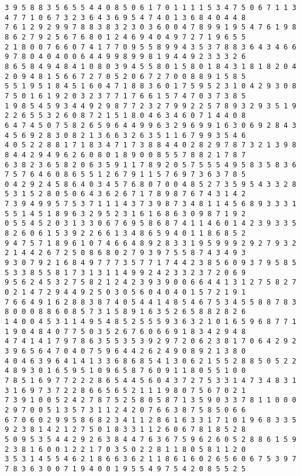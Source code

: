 \begin{verbatim}
3 9 5 8 8 3 5 6 5 5 4 4 0 8 5 0 6 1 7 0 1 1 1 1 5 3 4 7 5 0 6 7 1 1 3 4 7 7 1 0 6 7 3 2 3 6 4 3 6 9 5 4 7 4 0 1 3 6 8 4 0 4 4 8
7 6 1 2 9 2 9 9 7 8 8 3 8 3 2 3 0 3 6 0 0 4 7 8 9 9 1 9 5 4 7 6 1 9 8 8 6 2 7 9 2 5 6 7 6 8 0 1 2 4 6 9 4 0 4 9 7 2 7 1 9 6 5 5
2 1 8 0 0 7 6 6 0 7 4 1 7 7 0 9 5 5 8 9 9 4 3 5 3 7 8 8 3 6 4 3 4 6 6 9 7 8 0 4 0 4 0 0 6 4 4 9 9 8 9 9 8 1 9 4 4 9 2 3 3 3 2 6
8 6 5 8 4 9 4 8 4 1 0 8 0 3 9 4 5 5 8 0 1 5 8 0 1 8 4 3 1 8 1 8 2 0 4 2 0 9 4 8 1 5 6 6 7 2 7 0 5 2 0 6 7 2 7 0 0 8 8 9 1 5 8 5
5 5 1 9 5 1 8 4 5 1 6 0 4 7 1 8 8 3 6 0 1 7 5 9 5 2 3 1 0 4 2 9 3 0 8 7 5 0 1 6 1 9 2 0 3 2 3 7 7 1 7 6 6 1 5 7 4 7 0 3 7 3 8 5
1 9 8 5 4 5 9 3 4 4 9 2 9 8 7 7 2 3 2 7 9 9 2 2 5 7 8 9 3 2 9 3 5 1 9 2 2 6 5 5 3 2 6 0 8 7 2 1 5 1 8 0 4 6 3 4 6 0 7 1 4 4 0 8
6 4 7 4 5 0 7 5 8 2 6 5 9 6 4 4 9 9 6 3 2 9 6 9 9 1 6 3 0 6 9 2 8 4 3 4 5 6 9 2 8 3 0 8 2 1 3 6 6 3 2 6 3 5 1 1 6 7 9 9 3 5 4 6
4 0 5 2 2 8 8 1 7 1 8 3 4 7 1 7 3 8 8 4 4 0 2 8 2 9 7 8 7 3 2 1 3 9 8 8 4 4 2 9 4 9 6 2 6 0 8 0 1 8 9 0 0 8 5 5 7 8 8 2 1 7 8 7
6 3 8 2 3 6 5 8 2 0 6 3 5 9 1 1 7 8 9 2 0 5 7 5 5 5 4 9 5 8 3 5 8 3 6 7 5 7 6 4 6 0 8 6 5 5 1 2 6 7 9 1 1 5 7 6 9 7 3 6 3 7 8 5
0 4 2 9 2 4 5 8 6 4 0 3 4 5 7 6 8 0 7 0 0 4 8 5 2 7 3 5 9 5 4 3 3 2 8 5 3 1 5 2 8 0 5 0 6 4 3 6 2 6 7 1 7 8 9 8 7 6 7 4 3 1 4 2
7 3 9 4 9 9 5 7 5 3 7 1 1 1 4 3 7 3 9 8 7 3 4 8 1 1 4 5 6 8 9 3 3 3 1 5 5 1 4 5 1 8 9 6 3 2 9 5 2 3 1 6 1 6 8 6 3 0 9 8 7 1 9 2
0 5 5 4 5 2 0 3 1 3 3 0 6 7 6 9 5 8 6 8 7 4 1 1 4 6 0 1 4 2 3 9 3 3 5 8 2 6 0 6 1 5 3 9 2 2 6 6 1 3 4 8 6 5 9 4 0 1 1 8 6 8 5 2
9 4 7 5 7 1 8 9 6 1 0 7 4 6 6 4 8 9 2 8 3 3 1 9 5 9 9 9 2 9 2 7 9 3 2 2 1 4 4 2 6 7 2 5 0 8 6 8 0 2 7 9 3 9 7 5 5 8 7 4 3 4 9 3
9 3 0 7 9 2 1 6 8 4 9 7 7 7 3 5 7 7 1 7 4 4 2 3 8 5 6 0 9 3 7 9 5 8 5 5 3 3 8 5 5 8 1 7 3 1 3 1 1 4 9 9 2 4 2 3 3 2 3 7 2 0 6 9
9 5 6 2 4 5 3 2 7 5 8 2 1 2 4 2 3 9 3 9 0 0 6 6 4 4 1 3 1 2 7 5 8 2 7 0 2 1 4 7 2 9 4 4 9 2 5 0 3 0 5 6 0 4 0 4 0 1 5 7 2 1 9 1
7 6 6 4 9 1 6 2 8 8 3 8 7 4 0 5 4 4 1 4 8 5 4 6 7 5 3 4 5 5 8 8 7 8 3 8 0 0 0 8 8 6 0 8 5 7 3 1 5 8 9 1 6 3 5 2 6 5 8 8 2 8 2 6
1 4 0 0 4 5 3 1 1 4 9 5 4 8 5 2 5 5 5 9 3 6 3 2 1 0 1 6 5 9 6 8 7 7 1 1 9 0 4 8 4 0 7 7 5 0 3 5 2 6 7 6 0 6 6 9 1 8 3 4 2 9 4 8
4 7 4 1 4 1 7 9 7 8 6 3 5 5 3 5 3 9 2 9 7 2 0 6 2 3 8 1 7 0 6 4 2 9 2 3 9 6 5 6 4 7 0 4 0 7 5 9 6 4 4 2 6 2 4 9 0 8 9 2 1 3 8 0
4 0 4 6 3 9 6 4 1 4 1 3 3 6 8 6 8 5 4 1 3 0 6 2 1 5 5 2 8 8 5 0 5 2 2 4 8 9 3 0 1 6 5 9 5 1 0 9 6 5 8 7 6 0 9 1 1 8 0 5 5 1 0 0
7 8 5 1 6 9 7 7 2 2 2 8 6 5 4 4 5 6 0 4 3 7 2 7 5 3 3 1 4 7 3 4 8 3 1 3 1 6 9 7 3 7 2 2 8 6 6 5 6 5 2 1 1 1 9 8 0 7 5 6 7 0 2 1
7 3 9 1 0 0 5 2 4 2 7 8 7 5 2 5 8 0 5 8 7 1 3 5 9 0 3 3 7 8 1 1 0 0 0 2 9 7 0 0 5 1 3 5 7 3 1 1 2 4 2 0 7 6 6 3 8 7 5 8 5 0 6 6
6 7 0 6 0 2 9 9 5 8 6 8 2 3 4 1 1 2 8 6 1 6 3 3 1 7 1 0 1 9 6 8 3 3 5 9 2 3 8 1 4 2 1 2 7 5 0 1 8 3 3 1 1 2 6 0 6 7 8 1 8 5 2 8
5 0 9 5 3 5 4 4 2 9 2 6 3 8 4 4 7 6 3 6 7 5 9 6 2 6 0 5 2 8 8 6 1 5 9 2 3 8 1 6 0 0 1 2 2 1 7 0 3 5 0 2 2 8 1 1 8 0 5 8 1 1 2 0
3 5 3 1 4 5 5 4 6 2 1 8 6 6 3 6 2 1 1 8 6 1 6 0 2 6 5 6 0 6 7 5 3 9 7 7 8 3 6 3 0 0 7 1 9 4 0 0 1 9 5 5 4 9 7 5 4 2 0 8 5 5 2 5
\end{verbatim}
